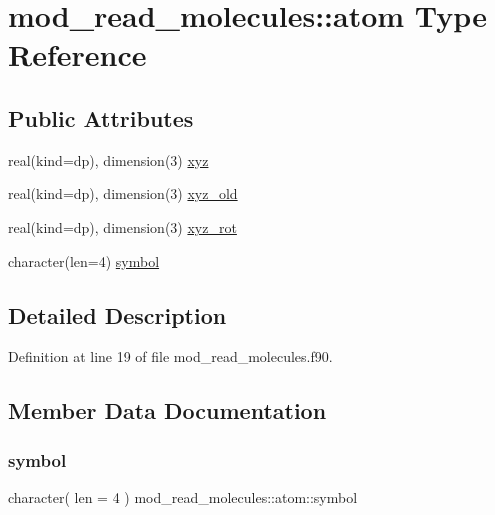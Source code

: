 \hypertarget{structmod__read__molecules_1_1atom}{}\section{mod\+\_\+read\+\_\+molecules\+:\+:atom Type Reference}
\label{structmod__read__molecules_1_1atom}
\subsection*{Public Attributes}
\begin{DoxyCompactItemize}
\item 
real(kind=dp), dimension(3) \hyperlink{structmod__read__molecules_1_1atom_a8ecbd0d9a907569fc1b2992c429ff117}{xyz}
\item 
real(kind=dp), dimension(3) \hyperlink{structmod__read__molecules_1_1atom_a87a78505ecd1a9c336b99a5904a9c1a4}{xyz\+\_\+old}
\item 
real(kind=dp), dimension(3) \hyperlink{structmod__read__molecules_1_1atom_a352f7c34ce08e0bc6f3158c2ed13989f}{xyz\+\_\+rot}
\item 
character(len=4) \hyperlink{structmod__read__molecules_1_1atom_a3d374962e9a352ca1233172ef98eabfb}{symbol}
\end{DoxyCompactItemize}


\subsection{Detailed Description}


Definition at line 19 of file mod\+\_\+read\+\_\+molecules.\+f90.



\subsection{Member Data Documentation}
\mbox{\label{structmod__read__molecules_1_1atom_a3d374962e9a352ca1233172ef98eabfb}} 
\subsubsection{\texorpdfstring{symbol}{symbol}}
{\footnotesize\ttfamily character( len = 4 ) mod\+\_\+read\+\_\+molecules\+::atom\+::symbol}



